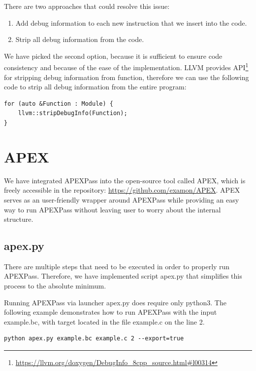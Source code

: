 \documentclass[12pt, twoside]{fithesis2}
\renewcommand{\_}{\leavevmode \kern0.07em\vbox{\hrule width0.4em}}
\newenvironment{myEnumerate}{
  \begin{enumerate}[
    leftmargin=2em,
    rightmargin=1em,
    itemsep=\parskip,
    parsep=0em,
    topsep=0em,
    partopsep=0em
]
}{
  \end{enumerate}
}
\begin{document}
There are two approaches that could resolve this issue:
\begin{myEnumerate}
\item{Add debug information to each new instruction that we insert into the code.}
\item{Strip all debug information from the code.}
\end{myEnumerate}

We have picked the second option, because it is sufficient to ensure code
consistency and because of the ease of the implementation. LLVM provides API\footnote{
\url{https://llvm.org/doxygen/DebugInfo_8cpp_source.html\#l00314}
}
for stripping debug information from function, therefore we can use the following
code to strip all debug information from the entire program:

\begin{verbatim}
for (auto &Function : Module) {
    llvm::stripDebugInfo(Function);
}
\end{verbatim}

\section{APEX}
\label{sec:impl_launcher}

We have integrated APEXPass into the open-source tool called APEX, which is
freely accessible in the repository: \url{https://github.com/examon/APEX}.
APEX serves as an user-friendly wrapper around APEXPass
while providing an easy way to run APEXPass without leaving user to
worry about the internal structure.

\subsection{apex.py}

There are multiple steps that need to be executed in order to properly
run APEXPass. Therefore, we have implemented script apex.py that simplifies
this process to the absolute minimum.

Running APEXPass via launcher apex.py does require only python3. The following
example demonstrates how to run APEXPass with the input example.bc, with target
located in the file example.c on the line 2.

\begin{verbatim}
python apex.py example.bc example.c 2 --export=true
\end{verbatim}
\end{document}
